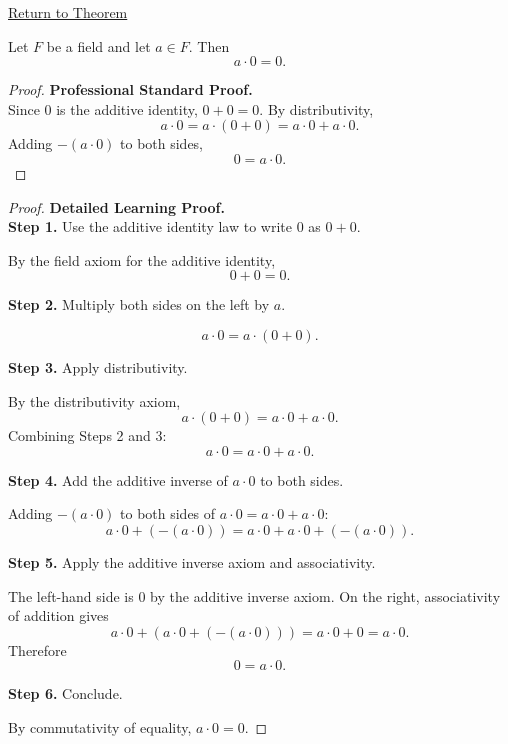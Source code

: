 \newpage
{}
\label{prf:zero-product}

\begin{remark*}[Return]
\hyperref[thm:zero-product]{Return to Theorem}
\end{remark*}

\begin{theorem*}
Let $F$ be a field and let $a\in F$.  Then
\[
a\cdot 0 = 0.
\]
\end{theorem*}

\begin{proof}
\textbf{Professional Standard Proof.}~\\
Since $0$ is the additive identity, $0 + 0 = 0$.  By distributivity,
\[
a\cdot 0 = a\cdot(0 + 0) = a\cdot 0 + a\cdot 0.
\]
Adding $-(a\cdot 0)$ to both sides,
\[
0 = a\cdot 0.
\]
\end{proof}

\begin{proof}
\textbf{Detailed Learning Proof.}~\\

\textbf{Step 1.} Use the additive identity law to write $0$ as $0 + 0$.

By the field axiom for the additive identity,
\[
0 + 0 = 0.
\]

\textbf{Step 2.} Multiply both sides on the left by $a$.

\[
a \cdot 0 = a \cdot (0 + 0).
\]

\textbf{Step 3.} Apply distributivity.

By the distributivity axiom,
\[
a \cdot (0 + 0) = a\cdot 0 + a\cdot 0.
\]
Combining Steps 2 and 3:
\[
a\cdot 0 = a\cdot 0 + a\cdot 0.
\]

\textbf{Step 4.} Add the additive inverse of $a\cdot 0$ to both sides.

Adding $-(a\cdot 0)$ to both sides of $a\cdot 0 = a\cdot 0 + a\cdot 0$:
\[
a\cdot 0 + (-(a\cdot 0)) = a\cdot 0 + a\cdot 0 + (-(a\cdot 0)).
\]

\textbf{Step 5.} Apply the additive inverse axiom and associativity.

The left-hand side is $0$ by the additive inverse axiom.  On the right,
associativity of addition gives
\[
a\cdot 0 + (a\cdot 0 + (-(a\cdot 0))) = a\cdot 0 + 0 = a\cdot 0.
\]
Therefore
\[
0 = a\cdot 0.
\]

\textbf{Step 6.} Conclude.

By commutativity of equality, $a\cdot 0 = 0$.
\end{proof}

